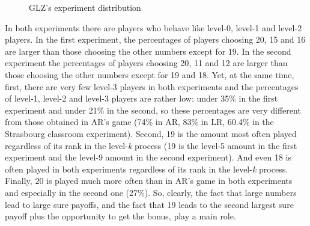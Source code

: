 \begin{Article}
\begin{refsection}[Umbhauer]
\begin{figure}[h]
  \centering
  \caption{GLZ's experiment distribution}
  \quad
    \label{fig:mainfig}
\end{figure}

In both experiments there are players who behave like level-0, level-1
and level-2 players. In the first experiment, the percentages of players
choosing 20, 15 and 16 are larger than those choosing the other numbers
except for 19. In the second experiment the percentages of players
choosing 20, 11 and 12 are larger than those choosing the other numbers
except for 19 and 18. Yet, at the same time, first, there are very few
level-3 players in both experiments and the percentages of level-1,
level-2 and level-3 players are rather low: under 35\% in the first
experiment and under 21\% in the second, so these percentages are very
different from those obtained in AR's game (74\% in AR, 83\% in LR,
60.4\% in the Strasbourg classroom experiment). Second, 19 is the amount
most often played regardless of its rank in the level-\emph{k} process
(19 is the level-5 amount in the first experiment and the level-9 amount
in the second experiment). And even 18 is often played in both
experiments regardless of its rank in the level-\emph{k} process.
Finally, 20 is played much more often than in AR's game in both
experiments and especially in the second one (27\%). So, clearly, the
fact that large numbers lead to large sure payoffs, and the fact that 19
leads to the second largest sure payoff plus the opportunity to get the
bonus, play a main role.


\end{refsection}
\end{Article}
